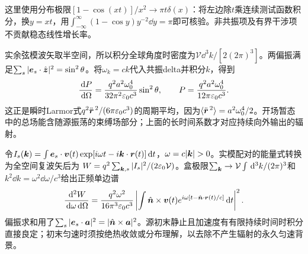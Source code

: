 这里使用分布极限$[1-\cos(xt)]/x^2\to\pi t\delta(x)$：将左边除$t$乘连续测试函数积分，换$y=xt$，用$\int_{-\infty}^\infty(1-\cos y)y^{-2}\dd y=\pi$即可核验。非共振项及有界干涉项不贡献稳态线性增长率。

实余弦模波矢取半空间，所以积分全球角度时密度为$\mathcal V\dd^3k/[2(2\pi)^3]$。两偏振满足$\sum_s|\boldsymbol{e}_s\cdot\hat{\boldsymbol{z}}|^2=\sin^2\theta$。将$\omega_k=ck$代入共振delta并积分$k$，得到
\[
 \frac{\,\mathrm d P}{\,\mathrm d\Omega}=\frac{q^2a^2\omega_0^4}{32\pi^2\varepsilon_0 c^3}\sin^2\theta,
 \qquad P=\frac{q^2a^2\omega_0^4}{12\pi\varepsilon_0 c^3}.
\]
这正是瞬时Larmor式$q^2\ddot{\boldsymbol{r}}^{\,2}/(6\pi\varepsilon_0 c^3)$的周期平均，因为$\langle\ddot{\boldsymbol{r}}^{\,2}\rangle=a^2\omega_0^4/2$。开场暂态中的总场能含随源振荡的束缚场部分；上面的长时间系数才对应持续向外输出的辐射。

令$I_s(\boldsymbol{k})=\int\boldsymbol{e}_s\cdot\boldsymbol{v}(t)\exp[i\omega t-i\boldsymbol{k}\cdot\boldsymbol{r}(t)]\,\mathrm d t$，$\omega=c|\vct k|>0$。实模配对的能量式转换为全空间复波矢后为
$W=q^2\sum_{\boldsymbol{k},s}|I_s|^2/(2\varepsilon_0\mathcal V)$。盒极限$\sum_{\boldsymbol{k}}\to\mathcal V\int\,\mathrm d^3k/(2\pi)^3$和$k^2\dd k=\omega^2\dd\omega/c^3$给出正频单边谱
\[
 \frac{\,\mathrm d^2W}{\,\mathrm d\omega\,\mathrm d\Omega}
 =\frac{q^2\omega^2}{16\pi^3\varepsilon_0 c^3}
 \left|\int\hat{\boldsymbol{n}}\times\boldsymbol{v}(t)
 e^{i\omega[t-\hat{\boldsymbol{n}}\cdot\boldsymbol{r}(t)/c]}\,\mathrm d t\right|^2.
\]
偏振求和用了$\sum_s|\boldsymbol{e}_s\cdot\boldsymbol{a}|^2=|\hat{\boldsymbol{n}}\times\boldsymbol{a}|^2$。源初末静止且加速度有有限持续时间时积分直接良定；初末匀速时须按绝热收敛或分布理解，以去除不产生辐射的永久匀速背景。


